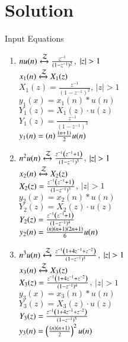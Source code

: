\documentclass[journal,12pt,onecolumn]{IEEEtran}
\theoremstyle{remark}
\begin{document}
\section*{Solution}
\begin{table}[h]
  \centering
  
  \caption{Input Equations}
  \label{tab:input-equations}
\end{table}
\begin{enumerate}
    \item $n u(n) \xleftrightarrow{\mathcal{Z}} \frac{z^{-1}}{(1-z^{-1})^2}$,  $\left\vert z\right\vert > 1$ \\
    $x_1(n) \xleftrightarrow{\mathcal{Z}}X_1(z)$\\
    $X_1(z) = \frac{z^{-1}}{(1-z^{-1})^2}$,  $|z| > 1$ \\
    $y_1(x) = x_1(n)* u(n)$\\
    $Y_1(z) = X_1(z) \cdot u(z)$ \\
    $Y_1(z) = \frac{z^{-1}}{(1-z^{-1})^3}$ \\
    $y_1(n) = \left(n\right)\frac{\left(n+1\right)}{2}u(n)$\\
    
    \item $n^2 u(n) \xleftrightarrow{\mathcal{Z}} \frac{z^{-1}\left(z^{-1}+1\right)}{(1-z^{-1})^3}$,  $\left\vert z\right\vert > 1$\\
    $x_2(n) \xleftrightarrow{\mathcal{Z}}X_2(z)$\\
    $X_2(z) = \frac{z^{-1}\left(z^{-1}+1\right)}{(1-z^{-1})^3}$,  $|z| > 1$ \\
    $y_2(x) = x_2(n)* u(n)$\\
    $Y_2(z) = X_2(z) \cdot u(z)$ \\
    $Y_2(z) = \frac{z^{-1}\left(z^{-1}+1\right)}{(1-z^{-1})^4}$ \\ 
    $y_2(n) = \frac{\left(n\right)\left(n+1\right)\left(2n+1\right)}{6}u(n)$ \\
    
    \item $n^3 u(n) \xleftrightarrow{\mathcal{Z}} \frac{z^{-1}\left(1+4z^{-1}+z^{-2}\right)}{(1-z^{-1})^4}$,  $\left\vert z\right\vert >1$ \\ 
    $x_3(n) \xleftrightarrow{\mathcal{Z}}X_3(z)$\\
    $X_3(z) = \frac{z^{-1}\left(1+4z^{-1}+z^{-2}\right)}{(1-z^{-1})^4}$,  $|z| > 1$ \\
    $y_3(x) = x_3(n)* u(n)$\\
    $Y_3(z) = X_3(z) \cdot u(z)$ \\
    $Y_3(z) = \frac{z^{-1}\left(1+4z^{-1}+z^{-2}\right)}{(1-z^{-1})^5}$\\
    $y_3(n) = \left(\frac{\left(n\right)\left(n+1\right)}{2}\right)^2u(n)$
\end{enumerate}
\end{document}
